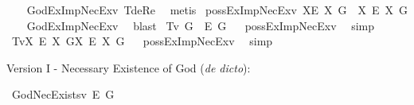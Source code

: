 \begin{isabellebody}
%
\ \ %
%
\isamarkupfalse%
\ GodExImpNecEx{\isacharunderscore}v{}\ T{}{\isacharunderscore}deRe\ \isamarkupfalse%
\ metis%
%
\isanewline
%
\isamarkupfalse%
\ possExImpNecEx{\isacharunderscore}v{}{\isacharcolon}\ {\isachardoublequoteopen}{\isasymlfloor}{\isacharparenleft}{\isasymlambda}X{\isachardot}\isactrlbold {\isasymdiamond}\isactrlbold {\isasymexists}\isactrlsup E\ X{\isacharparenright}\ \isactrlbold {\isasymdown}G\ \isactrlbold {\isasymrightarrow}\ {\isacharparenleft}{\isasymlambda}X{\isachardot}\ \isactrlbold {\isasymbox}\isactrlbold {\isasymexists}\isactrlsup E\ X{\isacharparenright}\ \isactrlbold {\isasymdown}G{\isasymrfloor}{\isachardoublequoteclose}\isanewline
%
\ \ %
%
\isamarkupfalse%
\ GodExImpNecEx{\isacharunderscore}v{}\ \isamarkupfalse%
\ blast%
%
\isanewline
%
\isanewline
{}\isamarkupfalse%
\ T{}{\isacharunderscore}v{}{\isacharcolon}{\isachardoublequoteopen}{\isasymlfloor}\isactrlbold {\isasymdiamond}\isactrlbold {\isasymexists}\ \isactrlbold {\isasymdown}G{\isasymrfloor}\ {\isasymlongrightarrow}\ {\isasymlfloor}\isactrlbold {\isasymbox}\isactrlbold {\isasymexists}\isactrlsup E\ \isactrlbold {\isasymdown}G{\isasymrfloor}{\isachardoublequoteclose}%
\ %
%
\isamarkupfalse%
\ possExImpNecEx{\isacharunderscore}v{}\ \isamarkupfalse%
\ simp%
%
%
\isanewline
{}\isamarkupfalse%
\ T{}{\isacharunderscore}v{}{\isacharcolon}{\isachardoublequoteopen}{\isasymlfloor}{\isacharparenleft}{\isasymlambda}X{\isachardot}\ \isactrlbold {\isasymdiamond}\isactrlbold {\isasymexists}\isactrlsup E\ X{\isacharparenright}\ \isactrlbold {\isasymdown}G{\isasymrfloor}{\isasymlongrightarrow}{\isasymlfloor}{\isacharparenleft}{\isasymlambda}X{\isachardot}\ \isactrlbold {\isasymbox}\isactrlbold {\isasymexists}\isactrlsup E\ X{\isacharparenright}\ \isactrlbold {\isasymdown}G{\isasymrfloor}{\isachardoublequoteclose}%
\ %
%
\isamarkupfalse%
\ possExImpNecEx{\isacharunderscore}v{}\ \isamarkupfalse%
\ simp%
%
%
%
\isamarkuptrue%
%
\begin{isamarkuptext}%
Version I - Necessary Existence of God (\emph{de dicto}):%
\end{isamarkuptext}\isamarkuptrue%
\isamarkupfalse%
\ GodNecExists{\isacharunderscore}v{}{\isacharcolon}\ {\isachardoublequoteopen}{\isasymlfloor}\isactrlbold {\isasymbox}\isactrlbold {\isasymexists}\isactrlsup E\ \isactrlbold {\isasymdown}G{\isasymrfloor}{\isachardoublequoteclose}\isanewline

\end{isabellebody}

